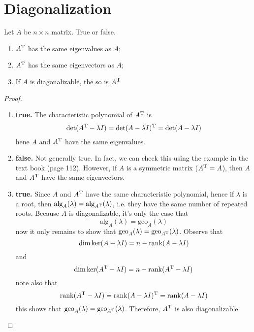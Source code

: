 \documentclass{article}
\begin{document}
\section{Diagonalization}
\begin{exercise}
  Let $A$ be $n\times n$ matrix. True or false.
  \begin{enumerate}[label={(\alph*)}]
    \item $A^\mathrm{T}$ has the same eigenvalues as $A$;
    \item $A^\mathrm{T}$ has the same eigenvectors as $A$;
    \item If $A$ is diagonalizable, the so is $A^\mathrm{T}$
  \end{enumerate}
\end{exercise}
\begin{proof}
  \begin{enumerate}[label={(\alph*)}]
    \item \textbf{true.} The characteristic polynomial of $A^\mathrm{T}$ is
      \begin{align*}
        \det(A^\mathrm{T}-\lambda I)
        =\det(A-\lambda I)^\mathrm{T}
        =\det(A-\lambda I)
      \end{align*}
      hene $A$ and $A^\mathrm{T}$ have the same eigenvalues.
    \item \textbf{false.} Not generally true. In fact, we can check this
      using the example in the text book (page 112). 
      However, if $A$ is a symmetric matrix ($A^\mathrm{T}=A$), then $A$ and 
      $A^\mathrm{T}$ have the same eigenvectors.
    \item \textbf{true.} 
      Since $A$ and $A^\mathrm{T}$ have the same characteristic polynomial, hence
      if $\lambda$ is a root, then
      $\textrm{alg}_A(\lambda)=\textrm{alg}_{A^\mathrm{T}}(\lambda)$, i.e. they have
      the same number of repeated roots. Because $A$ is diagonalizable, it's only
      the case that 
      \[\textrm{alg}_{A}(\lambda)=\textrm{geo}_{A}(\lambda)\] 
      now it only remains to show that 
      $\textrm{geo}_{A}(\lambda)=\textrm{geo}_{A^\mathrm{T}}(\lambda)$. Observe that
      \[ \dim\ker(A-\lambda I) =n-\operatorname{rank}(A-\lambda I) \]
      and
      \[ \dim\ker(A^\mathrm{T}-\lambda I) =n-\operatorname{rank}(A^\mathrm{T} -\lambda I) \] 
      note also that
      \[
        \operatorname{rank}(A^\mathrm{T}-\lambda I)=
        \operatorname{rank}(A-\lambda I)^\mathrm{T}=
        \operatorname{rank}(A-\lambda I)
      \]
      this shows that $\textrm{geo}_{A}(\lambda)=\textrm{geo}_{A^\mathrm{T}}(\lambda)$.
      Therefore, $A^\mathrm{T}$ is also diagonalizable.
  \end{enumerate}
\end{proof}
\end{document}
